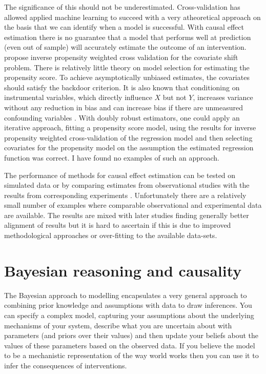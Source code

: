 \documentclass[11pt,a4paper,oneside]{book}
\theoremstyle{plain}
\theoremstyle{definition}
\begin{document}
The significance of this should not be underestimated. Cross-validation has allowed applied machine learning to succeed with a very atheoretical approach on the basis that we can identify when a model is successful. With causal effect estimation there is no guarantee that a model that performs well at prediction (even out of sample) will accurately estimate the outcome of an intervention. \citet{Sugiyama2007} propose inverse propensity weighted cross validation for the covariate shift problem. There is relatively little theory on model selection for estimating the propensity score. To achieve asymptotically unbiased estimates, the covariates should satisfy the backdoor criterion. It is also known that conditioning on instrumental variables, which directly influence $X$ but not $Y$, increases variance without any reduction in bias and can increase bias if there are unmeasured confounding variables \citep{Wooldridge2009,Bhattacharya2012,Pearl2012b,Myers2011}. With doubly robust estimators, one could apply an iterative approach, fitting a propensity score model, using the results for inverse propensity weighted cross-validation of the regression model and then selecting covariates for the propensity model on the assumption the estimated regression function was correct. I have found no examples of such an approach.

The performance of methods for causal effect estimation can be tested on simulated data \citep{Frolich2001,zhao2004using,Hill2011,Dorie2016} or by comparing estimates from observational studies with the results from corresponding experiments \citep{lalonde1986evaluating,Fraker1987,heckman1997matching,heckman1998characterizing,dehejia1999causal,Smith2001,Anglemyer2014}. Unfortunately there are a relatively small number of examples where comparable observational and experimental data are available. The results are mixed with later studies finding generally better alignment of results but it is hard to ascertain if this is due to improved methodological approaches or over-fitting to the available data-sets.  

\section{Bayesian reasoning and causality}
\label{sec:bayesian_causality}
The Bayesian approach to modelling encapsulates a very general approach to combining prior knowledge and assumptions with data to draw inferences. You can specify a complex model, capturing  your assumptions about the underlying mechanisms of your system, describe what you are uncertain about with parameters (and priors over their values) and then update your beliefs about the values of these parameters based on the observed data. If you believe the model to be a mechanistic representation of the way world works then you can use it to infer the consequences of interventions.
\end{document}
